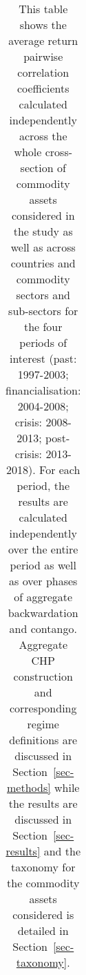 \documentclass[
  authoryear,
  preprint,
  3p]{elsarticle}
\begin{document}
\newpage

\begingroup\fontsize{7}{9}\selectfont

\begin{longtable}[t]{>{}l>{}l>{}l>{}r>{}r>{}r>{}r>{}r}

\caption{\label{tbl-correlations-periods}This table shows the average
return pairwise correlation coefficients calculated independently across
the whole cross-section of commodity assets considered in the study as
well as across countries and commodity sectors and sub-sectors for the
four periods of interest (past: 1997-2003; financialisation: 2004-2008;
crisis: 2008-2013; post-crisis: 2013-2018). For each period, the results
are calculated independently over the entire period as well as over
phases of aggregate backwardation and contango. Aggregate CHP
construction and corresponding regime definitions are discussed in
Section~\ref{sec-methods} while the results are discussed in
Section~\ref{sec-results} and the taxonomy for the commodity assets
considered is detailed in Section~\ref{sec-taxonomy}.}

\tabularnewline


\end{longtable}
\end{document}
